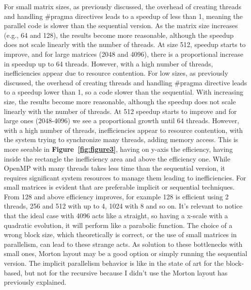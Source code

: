 For small matrix sizes, as previously discussed, the overhead of creating threads and handling \#pragma directives leads to a speedup of less than 1, meaning the parallel code is slower than the sequential version. As the matrix size increases (e.g., 64 and 128), the results become more reasonable, although the speedup does not scale linearly with the number of threads. At size 512, speedup starts to improve, and for large matrices (2048 and 4096), there is a proportional increase in speedup up to 64 threads. However, with a high number of threads, inefficiencies appear due to resource contention. For low sizes, as previously discussed, the overhead of creating threads and handling \#pragma directive leads to a speedup lower than 1, so a code slower than the sequential. With increasing size, the results become more reasonable, although the speedup does not scale linearly with the number of threads. At 512 speedup starts to improve and for large ones (2048-4096) we see a proportional growth until 64 threads. However, with a high number of threads, inefficiencies appear to resource contention, with the system trying to synchronize many threads, adding memory access. This is more seeable in \textbf{Figure~\ref{fig:figure3}}, having on y-axis the efficiency, having inside the rectangle the inefficiency area and above the efficiency one. While OpenMP with many threads takes less time than the sequential version, it requires significant system resources to manage them leading to inefficiencies. For small matrices is evident that are preferable implicit or sequential techniques. From 128 and above efficiency improves, for example 128 is efficient using 2 threads, 256 and 512 with up to 4, 1024 with 8 and so on. It's relevant to notice that the ideal case with 4096 acts like a straight, so having a x-scale with a quadratic evolution, it will perform like a parabolic function. The choice of a wrong block size, which theoretically is correct, or the use of small matrices in parallelism, can lead to these strange acts. As solution to these bottlenecks with small ones, Morton layout may be a good option or simply running the sequential version. The implicit parallelism behavior is like in the state of art for the block-based, but not for the recursive because I didn’t use the Morton layout has previously explained.
